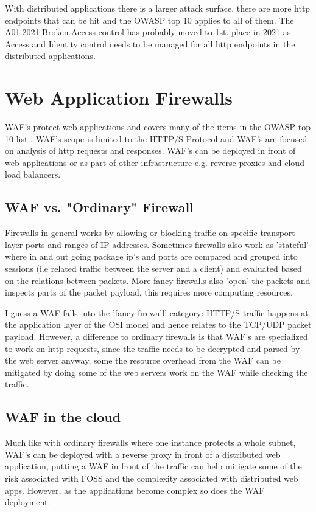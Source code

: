 \documentclass[
	letterpaper, %
	10pt, %
	unnumberedsections, %
	twoside, %
]{APAAssignment}
\begin{document}
With distributed applications there is a larger attack surface, there are more http endpoints that can be hit and the OWASP top 10 applies to all of them. The A01:2021-Broken Access control \cite{OWASPtop10} has probably moved to 1st. place in 2021 as Access and Identity control needs to be managed for all http endpoints in the distributed applications.       

\section{Web Application Firewalls}
WAF's protect web applications and covers many of the items in the OWASP top 10 list \cite{OWASPtop10}. WAF's scope is limited to the HTTP/S Protocol and WAF's are focused on analysis of http requests and responses. WAF's can be deployed in front of web applications or as part of other infrastructure e.g. reverse proxies and cloud load balancers.   

\subsection{WAF vs. "Ordinary" Firewall}
Firewalls in general works by allowing or blocking traffic on specific transport layer ports and ranges of IP addresses. Sometimes firewalls also work as 'stateful' where in and out going package ip's and ports are compared and grouped into sessions (i.e related traffic between the server and a client) and evaluated based on the relations between packets. More fancy firewalls also 'open' the packets and inspects parts of the packet payload, this requires more computing resources. 

I guess a WAF falls into the 'fancy firewall' category: HTTP/S traffic happens at the application layer of the OSI model and hence relates to the TCP/UDP packet payload. However, a difference to ordinary firewalls is that WAF's are specialized to work on http requests, since the traffic needs to be decrypted and parsed by the web server anyway, some the resource overhead from the WAF can be mitigated by doing some of the web servers work on the WAF while checking the traffic.    

\subsection{WAF in the cloud}
Much like with ordinary firewalls where one instance protects a whole subnet, WAF's can be deployed with a reverse proxy in front of a distributed web application, putting a WAF in front of the traffic can help mitigate some of the risk associated with FOSS and the complexity associated with distributed web apps. However, as the applications become complex so does the WAF deployment. 
\end{document}
